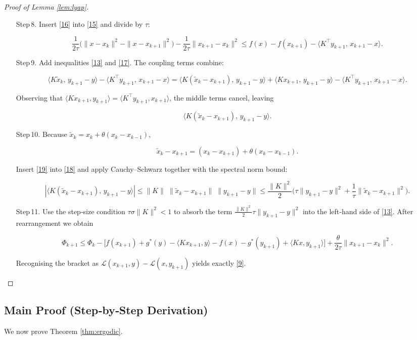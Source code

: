 \documentclass{article}
\begin{document}
\begin{proof}[Proof of Lemma \ref{lem:lyap}]
\begin{enumerate}
\item[Step 8.] Insert \eqref{16} into \eqref{15} and divide by \(\tau\):

\[
\frac{1}{2\tau}\bigl(\|x-x_{k}\|^{2}-\|x-x_{k+1}\|^{2}\bigr)
-\frac{1}{2\tau}\|x_{k+1}-x_{k}\|^{2}
\le
f(x)-f(x_{k+1})-\langle K^{\top}y_{k+1},\,x_{k+1}-x\rangle .
\tag{17}
\]

\item[Step 9.] Add inequalities \eqref{13} and \eqref{17}. The coupling terms combine:

\[
\langle K\tilde{x}_{k},\,y_{k+1}-y\rangle
-\langle K^{\top}y_{k+1},\,x_{k+1}-x\rangle
= \langle K(\tilde{x}_{k}-x_{k+1}),\,y_{k+1}-y\rangle
+ \langle Kx_{k+1},\,y_{k+1}-y\rangle
- \langle K^{\top}y_{k+1},\,x_{k+1}-x\rangle .
\]

Observing that \(\langle Kx_{k+1},y_{k+1}\rangle
= \langle K^{\top}y_{k+1},x_{k+1}\rangle\), the middle terms cancel, leaving

\[
\langle K(\tilde{x}_{k}-x_{k+1}),\,y_{k+1}-y\rangle .
\tag{18}
\]

\item[Step 10.] Because \(\tilde{x}_{k}=x_{k}+\theta(x_{k}-x_{k-1})\),

\[
\tilde{x}_{k}-x_{k+1}= (x_{k}-x_{k+1})+\theta(x_{k}-x_{k-1}).
\tag{19}
\]

Insert \eqref{19} into \eqref{18} and apply Cauchy–Schwarz together with the spectral norm bound:

\[
|\langle K(\tilde{x}_{k}-x_{k+1}),\,y_{k+1}-y\rangle|
\le
\|K\|\;\|\tilde{x}_{k}-x_{k+1}\|\;\|y_{k+1}-y\|
\le
\frac{\|K\|^{2}}{2}\bigl(\tau\|y_{k+1}-y\|^{2}+\frac{1}{\tau}\|\tilde{x}_{k}-x_{k+1}\|^{2}\bigr).
\tag{20}
\]

\item[Step 11.] Use the step‑size condition \(\tau\sigma\|K\|^{2}<1\) to absorb the term \(\frac{\|K\|^{2}}{2}\tau\|y_{k+1}-y\|^{2}\) into the left‑hand side of \eqref{13}. After rearrangement we obtain

\[
\Phi_{k+1}
\le
\Phi_{k}
-\bigl[f(x_{k+1})+g^{*}(y)-\langle Kx_{k+1},y\rangle
    -f(x)-g^{*}(y_{k+1})+\langle Kx,y_{k+1}\rangle\bigr]
+\frac{\theta}{2\tau}\|x_{k+1}-x_{k}\|^{2}.
\tag{21}
\]

Recognising the bracket as \(\mathcal{L}(x_{k+1},y)-\mathcal{L}(x,y_{k+1})\) yields exactly \eqref{9}.
\end{enumerate}
\end{proof}

\subsection*{Main Proof (Step‑by‑Step Derivation)}
We now prove Theorem \ref{thm:ergodic}.
\end{document}

